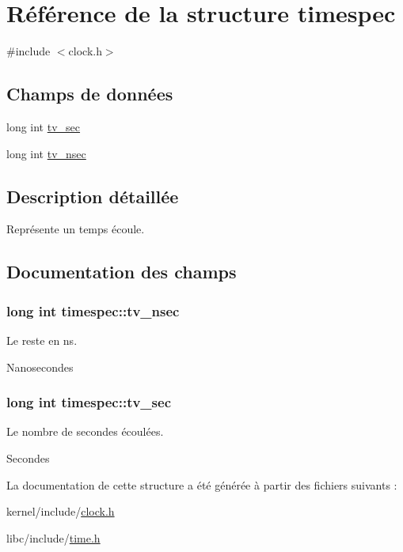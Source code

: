 \hypertarget{structtimespec}{\section{Référence de la structure timespec}
\label{structtimespec}
}


{\ttfamily \#include $<$clock.\+h$>$}

\subsection*{Champs de données}
\begin{DoxyCompactItemize}
\item 
long int \hyperlink{structtimespec_af632894a12c37dea87073c0126f99fff}{tv\+\_\+sec}
\item 
long int \hyperlink{structtimespec_aa9689622a344d847333e534ac23d3093}{tv\+\_\+nsec}
\end{DoxyCompactItemize}


\subsection{Description détaillée}
Représente un temps écoule. 

\subsection{Documentation des champs}
\hypertarget{structtimespec_aa9689622a344d847333e534ac23d3093}{
\subsubsection[{tv\+\_\+nsec}]{\setlength{\rightskip}{0pt plus 5cm}long int timespec\+::tv\+\_\+nsec}}\label{structtimespec_aa9689622a344d847333e534ac23d3093}
Le reste en ns.

Nanosecondes \hypertarget{structtimespec_af632894a12c37dea87073c0126f99fff}{
\subsubsection[{tv\+\_\+sec}]{\setlength{\rightskip}{0pt plus 5cm}long int timespec\+::tv\+\_\+sec}}\label{structtimespec_af632894a12c37dea87073c0126f99fff}
Le nombre de secondes écoulées.

Secondes 

La documentation de cette structure a été générée à partir des fichiers suivants \+:\begin{DoxyCompactItemize}
\item 
kernel/include/\hyperlink{clock_8h}{clock.\+h}\item 
libc/include/\hyperlink{time_8h}{time.\+h}\end{DoxyCompactItemize}
